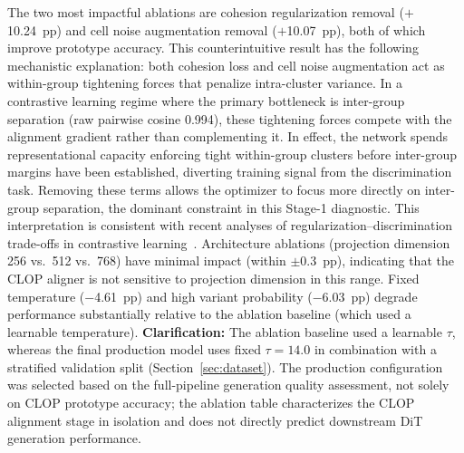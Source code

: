 \documentclass[11pt,a4paper]{article}
\begin{document}
The two most impactful ablations are cohesion regularization removal ($+$10.24~pp) and cell noise augmentation removal ($+$10.07~pp), both of which improve prototype accuracy. This counterintuitive result has the following mechanistic explanation: both cohesion loss and cell noise augmentation act as within-group tightening forces that penalize intra-cluster variance. In a contrastive learning regime where the primary bottleneck is inter-group separation (raw pairwise cosine 0.994), these tightening forces compete with the alignment gradient rather than complementing it. In effect, the network spends representational capacity enforcing tight within-group clusters before inter-group margins have been established, diverting training signal from the discrimination task. Removing these terms allows the optimizer to focus more directly on inter-group separation, the dominant constraint in this Stage-1 diagnostic. This interpretation is consistent with recent analyses of regularization--discrimination trade-offs in contrastive learning~\cite{ref-siglip}. Architecture ablations (projection dimension 256 vs.\ 512 vs.\ 768) have minimal impact (within $\pm$0.3~pp), indicating that the CLOP aligner is not sensitive to projection dimension in this range. Fixed temperature ($-$4.61~pp) and high variant probability ($-$6.03~pp) degrade performance substantially relative to the ablation baseline (which used a learnable temperature). \textbf{Clarification:} The ablation baseline used a learnable $\tau$, whereas the final production model uses fixed $\tau = 14.0$ in combination with a stratified validation split (Section~\ref{sec:dataset}). The production configuration was selected based on the full-pipeline generation quality assessment, not solely on CLOP prototype accuracy; the ablation table characterizes the CLOP alignment stage in isolation and does not directly predict downstream DiT generation performance.
\end{document}
